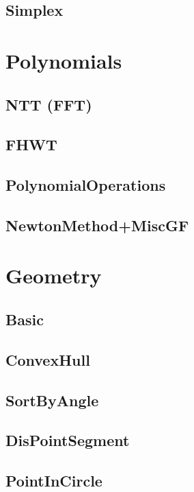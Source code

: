 	\subsection{Simplex}
	
	
\section{Polynomials}
	\subsection{NTT (FFT)}
	
	\subsection{FHWT}
	
	\subsection{PolynomialOperations}
	
	\subsection{NewtonMethod+MiscGF}
	
\section{Geometry}
	\subsection{Basic}
	
	\subsection{ConvexHull}
	
	\subsection{SortByAngle}
	
	\subsection{DisPointSegment}
	
	\subsection{PointInCircle}
	
